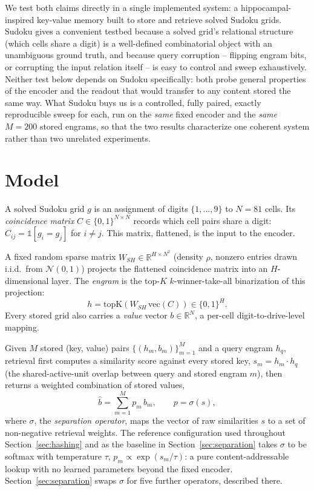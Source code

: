 \documentclass[11pt]{article}
\begin{document}
We test both claims directly in a single implemented system: a hippocampal-inspired key-value
memory built to store and retrieve solved Sudoku grids. Sudoku gives a convenient testbed
because a solved grid's relational structure (which cells share a digit) is a well-defined
combinatorial object with an unambiguous ground truth, and because query corruption --
flipping engram bits, or corrupting the input relation itself -- is easy to control and sweep
exhaustively. Neither test below depends on Sudoku specifically: both probe general properties
of the encoder and the readout that would transfer to any content stored the same way. What
Sudoku buys us is a controlled, fully paired, exactly reproducible sweep for each, run on the
\emph{same} fixed encoder and the \emph{same} $M=200$ stored engrams, so that the two results
characterize one coherent system rather than two unrelated experiments.

\section{Model}
\label{sec:model}

A solved Sudoku grid $g$ is an assignment of digits $\{1,\dots,9\}$ to $N=81$ cells. Its
\emph{coincidence matrix} $C \in \{0,1\}^{N\times N}$ records which cell pairs share a digit:
$C_{ij} = \mathbb{1}[g_i = g_j]$ for $i \neq j$. This matrix, flattened, is the input to the
encoder.

A fixed random sparse matrix $W_{SH} \in \mathbb{R}^{H\times N^2}$ (density $\rho$, nonzero
entries drawn i.i.d.\ from $\mathcal{N}(0,1)$) projects the flattened coincidence matrix into
an $H$-dimensional layer. The \emph{engram} is the top-$K$ $k$-winner-take-all binarization of
this projection:
\begin{equation}
h = \mathrm{topK}\!\left(W_{SH}\,\mathrm{vec}(C)\right) \in \{0,1\}^H .
\end{equation}
Every stored grid also carries a \emph{value} vector $b \in \mathbb{R}^N$, a per-cell
digit-to-drive-level mapping.

Given $M$ stored (key, value) pairs $\{(h_m,b_m)\}_{m=1}^M$ and a query engram $h_q$,
retrieval first computes a similarity score against every stored key,
$s_m = h_m \cdot h_q$ (the shared-active-unit overlap between query and stored engram $m$),
then returns a weighted combination of stored values,
\begin{equation}
\hat b = \sum_{m=1}^M p_m\, b_m , \qquad p = \sigma(s) ,
\end{equation}
where $\sigma$, the \emph{separation operator}, maps the vector of raw similarities $s$ to a
set of non-negative retrieval weights. The reference configuration used throughout
Section~\ref{sec:hashing} and as the baseline in Section~\ref{sec:separation} takes $\sigma$ to
be softmax with temperature $\tau$, $p_m \propto \exp(s_m/\tau)$: a pure content-addressable
lookup with no learned parameters beyond the fixed encoder. Section~\ref{sec:separation} swaps
$\sigma$ for five further operators, described there.
\end{document}
